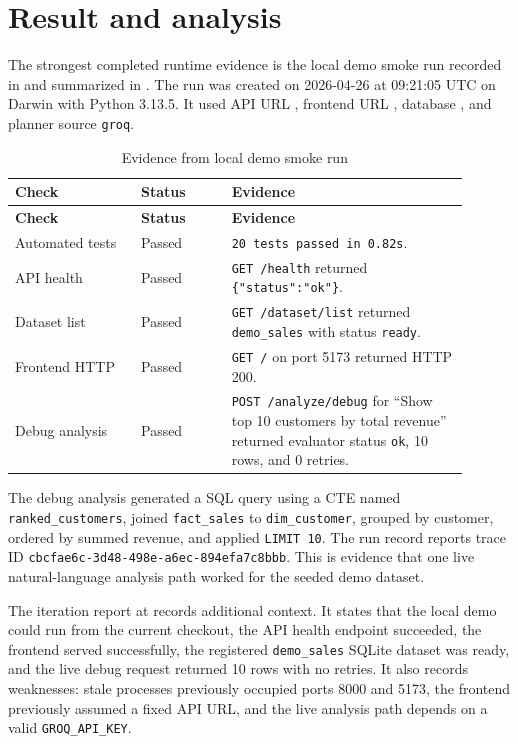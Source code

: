 \documentclass[12pt,a4paper]{article}
\begin{document}
\section{Result and analysis}

The strongest completed runtime evidence is the local demo smoke run recorded in  and summarized in . The run was created on 2026-04-26 at 09:21:05 UTC on Darwin with Python 3.13.5. It used API URL , frontend URL , database , and planner source \texttt{groq}.

\begin{longtable}{p{0.25\linewidth}p{0.18\linewidth}p{0.47\linewidth}}
\caption{Evidence from local demo smoke run} \\
\toprule
\textbf{Check} & \textbf{Status} & \textbf{Evidence} \\
\midrule
\endfirsthead
\toprule
\textbf{Check} & \textbf{Status} & \textbf{Evidence} \\
\midrule
\endhead
Automated tests & Passed & \texttt{20 tests passed in 0.82s}. \\
API health & Passed & \texttt{GET /health} returned \texttt{\{"status":"ok"\}}. \\
Dataset list & Passed & \texttt{GET /dataset/list} returned \texttt{demo\_sales} with status \texttt{ready}. \\
Frontend HTTP & Passed & \texttt{GET /} on port 5173 returned HTTP 200. \\
Debug analysis & Passed & \texttt{POST /analyze/debug} for ``Show top 10 customers by total revenue'' returned evaluator status \texttt{ok}, 10 rows, and 0 retries. \\
\bottomrule
\end{longtable}

The debug analysis generated a SQL query using a CTE named \texttt{ranked\_customers}, joined \texttt{fact\_sales} to \texttt{dim\_customer}, grouped by customer, ordered by summed revenue, and applied \texttt{LIMIT 10}. The run record reports trace ID \texttt{cbcfae6c-3d48-498e-a6ec-894efa7c8bbb}. This is evidence that one live natural-language analysis path worked for the seeded demo dataset.

The iteration report at  records additional context. It states that the local demo could run from the current checkout, the API health endpoint succeeded, the frontend served successfully, the registered \texttt{demo\_sales} SQLite dataset was ready, and the live debug request returned 10 rows with no retries. It also records weaknesses: stale processes previously occupied ports 8000 and 5173, the frontend previously assumed a fixed API URL, and the live analysis path depends on a valid \texttt{GROQ\_API\_KEY}.
\end{document}
